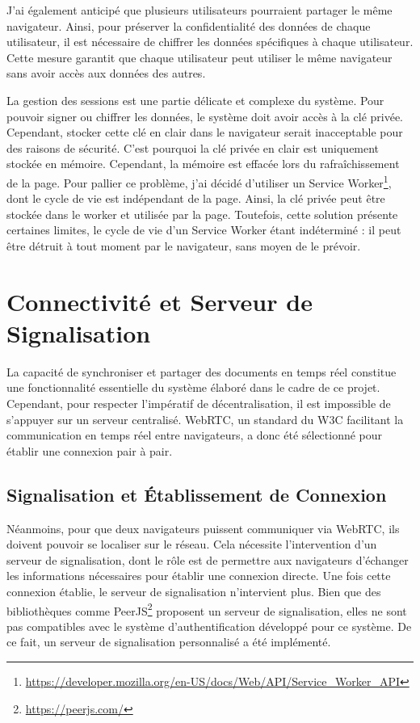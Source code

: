 J'ai également anticipé que plusieurs utilisateurs pourraient partager le même navigateur. Ainsi, pour préserver la confidentialité des données de chaque utilisateur, il est nécessaire de chiffrer les données spécifiques à chaque utilisateur. Cette mesure garantit que chaque utilisateur peut utiliser le même navigateur sans avoir accès aux données des autres.

La gestion des sessions est une partie délicate et complexe du système. Pour pouvoir signer ou chiffrer les données, le système doit avoir accès à la clé privée. Cependant, stocker cette clé en clair dans le navigateur serait inacceptable pour des raisons de sécurité. C'est pourquoi la clé privée en clair est uniquement stockée en mémoire. Cependant, la mémoire est effacée lors du rafraîchissement de la page. Pour pallier ce problème, j'ai décidé d'utiliser un Service Worker\footnote{\url{https://developer.mozilla.org/en-US/docs/Web/API/Service_Worker_API}}, dont le cycle de vie est indépendant de la page. Ainsi, la clé privée peut être stockée dans le worker et utilisée par la page. Toutefois, cette solution présente certaines limites, le cycle de vie d'un Service Worker étant indéterminé : il peut être détruit à tout moment par le navigateur, sans moyen de le prévoir.

\section{Connectivité et Serveur de Signalisation}

La capacité de synchroniser et partager des documents en temps réel constitue une fonctionnalité essentielle du système élaboré dans le cadre de ce projet. Cependant, pour respecter l'impératif de décentralisation, il est impossible de s'appuyer sur un serveur centralisé. WebRTC, un standard du W3C facilitant la communication en temps réel entre navigateurs, a donc été sélectionné pour établir une connexion pair à pair.

\subsection{Signalisation et Établissement de Connexion}

Néanmoins, pour que deux navigateurs puissent communiquer via WebRTC, ils doivent pouvoir se localiser sur le réseau. Cela nécessite l'intervention d'un serveur de signalisation, dont le rôle est de permettre aux navigateurs d'échanger les informations nécessaires pour établir une connexion directe. Une fois cette connexion établie, le serveur de signalisation n'intervient plus. Bien que des bibliothèques comme PeerJS\footnote{\url{https://peerjs.com/}} proposent un serveur de signalisation, elles ne sont pas compatibles avec le système d'authentification développé pour ce système. De ce fait, un serveur de signalisation personnalisé a été implémenté.

